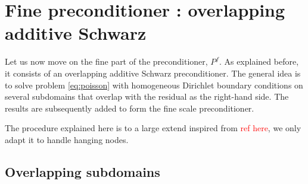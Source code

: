 \section{Fine preconditioner : overlapping additive Schwarz}

Let us now move on the fine part of the preconditioner, $P^f$. As explained before, it consists of an overlapping additive Schwarz preconditioner. The general idea is to solve problem \ref{eq:poisson} with homogeneous Dirichlet boundary conditions on several subdomains that overlap with the residual as the right-hand side. The results are subsequently added to form the fine scale preconditioner. 

The procedure explained here is to a large extend inspired from \textcolor{red}{ref here}, we only adapt it to handle hanging nodes. 

\subsection{Overlapping subdomains}


